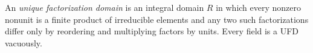 
An \emph{unique factorization domain} is an integral domain $R$ in which every nonzero nonunit is a finite product of irreducible elements and any two such factorizations differ only by reordering and multiplying factors by units. Every field is a UFD vacuously.
